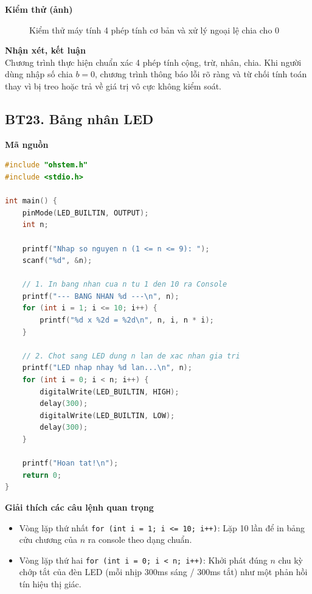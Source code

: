 \noindent\textbf{Kiểm thử (ảnh)}\\
\begin{figure}[H]
    \centering
    \caption{Kiểm thử máy tính 4 phép tính cơ bản và xử lý ngoại lệ chia cho 0}
    \label{fig:bt22}
\end{figure}

\noindent\textbf{Nhận xét, kết luận}\\
Chương trình thực hiện chuẩn xác 4 phép tính cộng, trừ, nhân, chia. Khi người dùng nhập số chia $b = 0$, chương trình thông báo lỗi rõ ràng và từ chối tính toán thay vì bị treo hoặc trả về giá trị vô cực không kiểm soát.


\subsection*{BT23. Bảng nhân LED}

\noindent\textbf{Mã nguồn}\\
\begin{lstlisting}[language=C]
#include "ohstem.h"
#include <stdio.h>

int main() {
    pinMode(LED_BUILTIN, OUTPUT);
    int n;

    printf("Nhap so nguyen n (1 <= n <= 9): ");
    scanf("%d", &n);

    // 1. In bang nhan cua n tu 1 den 10 ra Console
    printf("--- BANG NHAN %d ---\n", n);
    for (int i = 1; i <= 10; i++) {
        printf("%d x %2d = %2d\n", n, i, n * i);
    }

    // 2. Chot sang LED dung n lan de xac nhan gia tri
    printf("LED nhap nhay %d lan...\n", n);
    for (int i = 0; i < n; i++) {
        digitalWrite(LED_BUILTIN, HIGH);
        delay(300);
        digitalWrite(LED_BUILTIN, LOW);
        delay(300);
    }

    printf("Hoan tat!\n");
    return 0;
}
\end{lstlisting}

\noindent\textbf{Giải thích các câu lệnh quan trọng}\\
\begin{itemize}
    \item Vòng lặp thứ nhất \texttt{for (int i = 1; i <= 10; i++)}: Lặp 10 lần để in bảng cửu chương của $n$ ra console theo dạng chuẩn.
    \item Vòng lặp thứ hai \texttt{for (int i = 0; i < n; i++)}: Khởi phát đúng $n$ chu kỳ chớp tắt của đèn LED (mỗi nhịp 300ms sáng / 300ms tắt) như một phản hồi tín hiệu thị giác.
\end{itemize}

